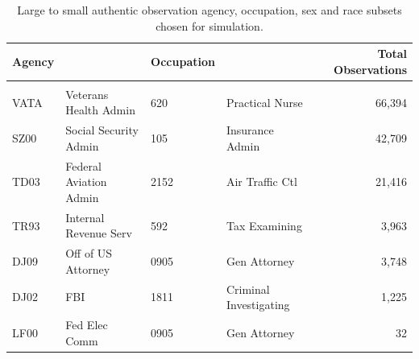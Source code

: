 \documentclass[10pt, letterpaper]{article}
\begin{document}
\begin{spacing}{1.0}
\begin{table}[h!]
    \centering
    \caption{Large to small authentic observation agency, occupation, sex and race subsets chosen for simulation.}
    \begin{tabular}{llllr}
      \hline
      Agency & & Occupation & & Total Observations \\ 
      \hline\\[-6pt]
      VATA & Veterans Health Admin & 620 & Practical Nurse & 66,394 \\
      SZ00 & Social Security Admin & 105 & Insurance Admin & 42,709 \\
      TD03 & Federal Aviation Admin & 2152 & Air Traffic Ctl & 21,416 \\
      TR93 & Internal Revenue Serv & 592 & Tax Examining & 3,963 \\ 
      DJ09 & Off of US Attorney & 0905 & Gen Attorney & 3,748 \\
      DJ02 & FBI & 1811 & Criminal Investigating & 1,225 \\
      LF00 & Fed Elec Comm & 0905 & Gen Attorney & 32 \\
      \hline
    \end{tabular}
    \label{table:AgencyOcc}
\end{table}

\clearpage


\end{spacing}
\end{document}
